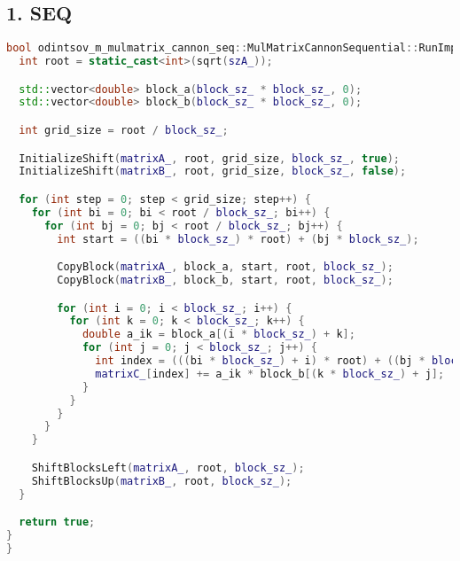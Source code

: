 \documentclass[12pt]{article}
\begin{document}
\subsection*{1. SEQ}
\begin{lstlisting}[language=C++,  breaklines=true]
bool odintsov_m_mulmatrix_cannon_seq::MulMatrixCannonSequential::RunImpl() {
  int root = static_cast<int>(sqrt(szA_));

  std::vector<double> block_a(block_sz_ * block_sz_, 0);
  std::vector<double> block_b(block_sz_ * block_sz_, 0);

  int grid_size = root / block_sz_;

  InitializeShift(matrixA_, root, grid_size, block_sz_, true);
  InitializeShift(matrixB_, root, grid_size, block_sz_, false);

  for (int step = 0; step < grid_size; step++) {
    for (int bi = 0; bi < root / block_sz_; bi++) {
      for (int bj = 0; bj < root / block_sz_; bj++) {
        int start = ((bi * block_sz_) * root) + (bj * block_sz_);

        CopyBlock(matrixA_, block_a, start, root, block_sz_);
        CopyBlock(matrixB_, block_b, start, root, block_sz_);

        for (int i = 0; i < block_sz_; i++) {
          for (int k = 0; k < block_sz_; k++) {
            double a_ik = block_a[(i * block_sz_) + k];
            for (int j = 0; j < block_sz_; j++) {
              int index = (((bi * block_sz_) + i) * root) + ((bj * block_sz_) + j);
              matrixC_[index] += a_ik * block_b[(k * block_sz_) + j];
            }
          }
        }
      }
    }

    ShiftBlocksLeft(matrixA_, root, block_sz_);
    ShiftBlocksUp(matrixB_, root, block_sz_);
  }

  return true;
}
}
\end{lstlisting}
\end{document}

